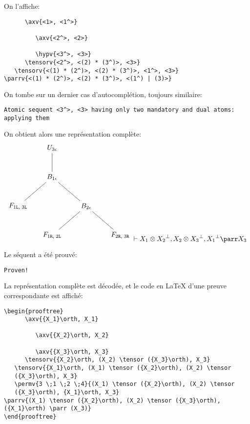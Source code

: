 \documentclass[11pt,a4paper]{article}
\theoremstyle{plain}
\theoremstyle{definition}
\theoremstyle{remark}
\newcommand*{\orth}{^\perp}
\newcommand*{\tensor}{\otimes}
\newcommand*{\hypv}[1]{\hypo{\vdash #1}}
\newcommand*{\axv}[1]{\infer{0}[\ensuremath{\mathit{ax}}]{\vdash #1}}
\newcommand*{\tensorv}[1]{\infer{2}[\ensuremath{\tensor}]{\vdash #1}}
\newcommand*{\parrv}[1]{\infer{1}[\ensuremath{\parr}]{\vdash #1}}
\newcommand*{\permv}[2]{\infer{1}[\ensuremath{\textit{ex}_{#1}}]{\vdash #2}}
\newcommand*{\Left}{\textnormal{\texttt{L}}}
\newcommand*{\Right}{\textnormal{\texttt{R}}}
\begin{document}
On l'affiche:

\begin{verbatim}
      \axv{<1>, <1^>}

         \axv{<2^>, <2>}

         \hypv{<3^>, <3>}
      \tensorv{<2^>, <(2) * (3^)>, <3>}
   \tensorv{<(1) * (2^)>, <(2) * (3^)>, <1^>, <3>}
\parrv{<(1) * (2^)>, <(2) * (3^)>, <(1^) | (3)>}
\end{verbatim}

On tombe sur un dernier cas d'autocomplétion, toujours similaire:
\begin{verbatim}
Atomic sequent <3^>, <3> having only two mandatory and dual atoms: 
applying them
\end{verbatim}

On obtient alors une représentation complète:
\begin{equation*}
    \begin{tikzpicture}%
        [level 2/.style={sibling distance=3.5cm}]
        \node {$U_{3 \epsilon}$}
        child {node {$B_{1 \epsilon}$}
            child {node {$F_{1 \Left, \; 3 \Left}$}}
            child {node {$B_{2 \epsilon}$}
                child{node {$F_{1 \Right, \; 2 \Left}$}}
                child{node {$F_{2 \Right, \; 3 \Right}$}}}
        };
    \end{tikzpicture} \vdash X_1 \tensor {X_2}\orth, X_2 \tensor {X_3}\orth, {X_1}\orth \parr X_3
\end{equation*}

Le séquent a été prouvé:
\begin{verbatim}
Proven!
\end{verbatim}

La représentation complète est décodée, et le code en \LaTeX{} d'une preuve correspondante est affiché:

\begin{verbatim}
\begin{prooftree}
      \axv{{X_1}\orth, X_1}

         \axv{{X_2}\orth, X_2}

         \axv{{X_3}\orth, X_3}
      \tensorv{{X_2}\orth, (X_2) \tensor ({X_3}\orth), X_3}
   \tensorv{{X_1}\orth, (X_1) \tensor ({X_2}\orth), (X_2) \tensor 
   ({X_3}\orth), X_3}
   \permv{3 \;1 \;2 \;4}{(X_1) \tensor ({X_2}\orth), (X_2) \tensor 
   ({X_3}\orth), {X_1}\orth, X_3}
\parrv{(X_1) \tensor ({X_2}\orth), (X_2) \tensor ({X_3}\orth), ({X_1}\orth) \parr (X_3)}
\end{prooftree}
\end{verbatim}
\end{document}
